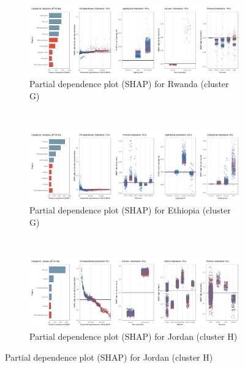 \begin{figure}[ht!]\ContinuedFloat
    \centering
   \begin{subfigure}[b]{\textwidth}
         \centering
         \caption{Partial dependence plot (SHAP) for Rwanda (cluster G)}
         \label{fig:5b_RWA}
         \includegraphics[width=\textwidth]{Figure 5b/Figure_5b_RWA}         
     \end{subfigure}
    \\
    \vspace{0.5cm}
   \begin{subfigure}[b]{\textwidth}
         \centering
         \caption{Partial dependence plot (SHAP) for Ethiopia (cluster G)}
         \label{fig:5b_ETH}
         \includegraphics[width=\textwidth]{Figure 5b/Figure_5b_ETH}         
     \end{subfigure}
    \\
    \vspace{0.5cm}
   \begin{subfigure}[b]{\textwidth}
         \centering
         \caption{Partial dependence plot (SHAP) for Jordan (cluster H)}
         \label{fig:5b_JOR}
         \includegraphics[width=\textwidth]{Figure 5b/Figure_5b_JOR}

\end{subfigure}
\end{figure}
